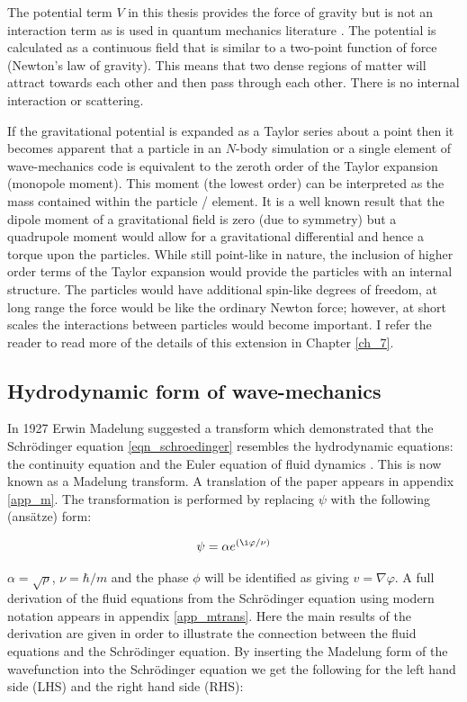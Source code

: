 The potential term $V$ in this thesis provides the force of gravity but is not an interaction term as is used in quantum mechanics literature \citep{bib_val}. The potential is calculated as a continuous field that is similar to a two-point function of force (Newton's law of gravity). This means that two dense regions of matter will attract towards each other and then pass through each other. There is no internal interaction or scattering.

If the gravitational potential is expanded as a Taylor series about a point then it becomes apparent that a particle in an $N$-body simulation or a single element of wave-mechanics code is equivalent to the zeroth order of the Taylor expansion (monopole moment). This moment (the lowest order) can be interpreted as the mass contained within the particle / element. It is a well known result that the dipole moment of a gravitational field is zero (due to symmetry) but a quadrupole moment would allow for a gravitational differential and hence a torque upon the particles. While still point-like in nature, the inclusion of higher order terms of the Taylor expansion would provide the particles with an internal structure. The particles would have additional spin-like degrees of freedom, at long range the force would be like the ordinary Newton force; however, at short scales the interactions between particles would become important. I refer the reader to read more of the details of this extension in Chapter \ref{ch_7}.

\subsection{Hydrodynamic form of wave-mechanics}
\label{hydro}
In 1927 Erwin Madelung suggested a transform which demonstrated that the Schr\"odinger equation \ref{eqn_schroedinger} resembles the hydrodynamic equations: the continuity equation and the Euler equation of fluid dynamics \citep{bib_mad}. This is now known as a Madelung transform. A translation of the paper appears in appendix \ref{app_m}. The transformation is performed by replacing $\psi$ with the following (ans\"atze) form:

\begin{equation}
\label{eqn_mad}
\psi = \alpha e^{(\i \varphi/\nu)}
\end{equation}

\noindent $\alpha = \sqrt{\rho}$, $\nu = \hbar/m$ and the phase $\phi$ will be identified as giving $v = \nabla \varphi$. A full derivation of the fluid equations from the Schr\"odinger equation using modern notation appears in appendix \ref{app_mtrans}. Here the main results of the derivation are given in order to illustrate the connection between the fluid equations and the Schr\"odinger equation. By inserting the Madelung form of the wavefunction into the Schr\"odinger equation we get the following for the left hand side (LHS) and the right hand side (RHS):

